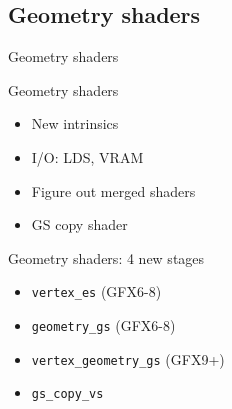 \documentclass[aspectratio=169,t,xcolor=table]{beamer}
\begin{document}
\subsection{Geometry shaders}

\begin{frame}{Geometry shaders}
\end{frame}

\begin{frame}{Geometry shaders}
    \LARGE
    \begin{itemize}
        \item New intrinsics
        \item I/O: LDS, VRAM
        \item Figure out merged shaders
        \item GS copy shader
    \end{itemize}
\end{frame}

\begin{frame}{Geometry shaders: 4 new stages}
    \LARGE
    \begin{itemize}
        \item \texttt{vertex\_es} (GFX6-8)
        \item \texttt{geometry\_gs} (GFX6-8)
        \item \texttt{vertex\_geometry\_gs} (GFX9+)
        \item \texttt{gs\_copy\_vs}
    \end{itemize}
%        
%        
\end{frame}
\end{document}
